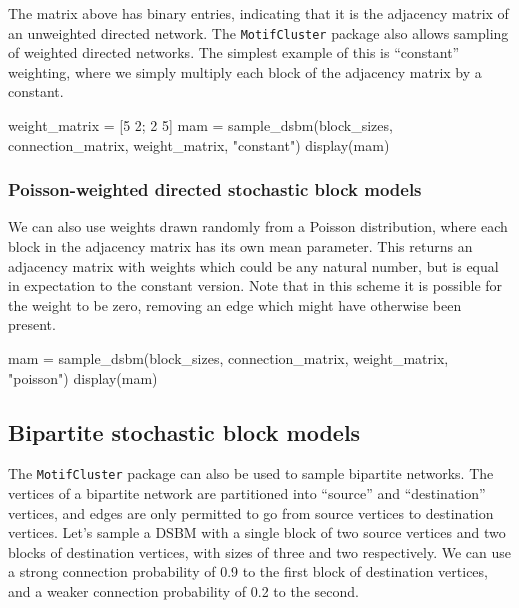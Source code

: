 \documentclass{article}
\begin{document}
The matrix above has binary entries,
indicating that it is the adjacency matrix of an unweighted
directed network.
The \texttt{MotifCluster} package also allows sampling of weighted directed networks.
The simplest example of this is ``constant'' weighting,
where we simply multiply each block of the adjacency matrix by a constant.

\begin{tcolorbox}[colback=black!5!white,colframe=black!15!white]
\begin{juliablock}
weight_matrix = [5 2; 2 5]
mam = sample_dsbm(block_sizes, connection_matrix, weight_matrix, "constant")
display(mam)
\end{juliablock}
\texttt{\obeylines\printpythontex}
\end{tcolorbox}

\subsubsection{Poisson-weighted directed stochastic block models}

We can also use weights drawn randomly from a Poisson distribution,
where each block in the adjacency matrix has its own mean parameter.
This returns an adjacency matrix with weights which could be any natural
number, but is equal in expectation to the constant version.
Note that in this scheme it is possible for the weight to be zero,
removing an edge which might have otherwise been present.

\begin{tcolorbox}[colback=black!5!white,colframe=black!15!white]
\begin{juliablock}
mam = sample_dsbm(block_sizes, connection_matrix, weight_matrix, "poisson")
display(mam)
\end{juliablock}
\texttt{\obeylines\printpythontex}
\end{tcolorbox}


\subsection{Bipartite stochastic block models}

The \texttt{MotifCluster} package can also be used to sample
bipartite networks.
The vertices of a bipartite network are partitioned
into ``source'' and ``destination'' vertices,
and edges are only permitted to go from source vertices
to destination vertices.
Let's sample a DSBM with a single block of two source vertices
and two blocks of destination vertices, with
sizes of three and two respectively.
We can use a strong connection probability of 0.9 to the first block of
destination vertices,
and a weaker connection probability of 0.2 to the second.
\end{document}
